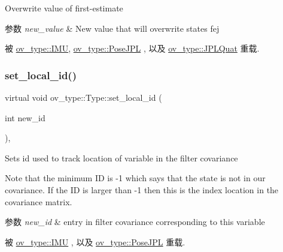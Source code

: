 Overwrite value of first-\/estimate 


\begin{DoxyParams}{参数}
{\em new\+\_\+value} & New value that will overwrite state\textquotesingle{}s fej \\
\hline
\end{DoxyParams}


被 \hyperlink{classov__type_1_1IMU_aadf4a83a2371984898ca8c6a339617ce}{ov\+\_\+type\+::\+I\+MU}, \hyperlink{classov__type_1_1PoseJPL_aa20a30cf44fefdb749565c0e60fe027a}{ov\+\_\+type\+::\+Pose\+J\+PL} , 以及 \hyperlink{classov__type_1_1JPLQuat_ae631d6cf4ed4170234272be498fd22e3}{ov\+\_\+type\+::\+J\+P\+L\+Quat} 重载.

\mbox{\label{classov__type_1_1Type_a52cb2fe6e25dbe8875da3fd618cf0b61}} 
\subsubsection{\texorpdfstring{set\+\_\+local\+\_\+id()}{set\_local\_id()}}
{\footnotesize\ttfamily virtual void ov\+\_\+type\+::\+Type\+::set\+\_\+local\+\_\+id (\begin{DoxyParamCaption}\item[{int}]{new\+\_\+id }\end{DoxyParamCaption})\hspace{0.3cm}{\ttfamily [inline]}, {\ttfamily [virtual]}}



Sets id used to track location of variable in the filter covariance 

Note that the minimum ID is -\/1 which says that the state is not in our covariance. If the ID is larger than -\/1 then this is the index location in the covariance matrix.


\begin{DoxyParams}{参数}
{\em new\+\_\+id} & entry in filter covariance corresponding to this variable \\
\hline
\end{DoxyParams}


被 \hyperlink{classov__type_1_1IMU_a9d4e915d474e8e13591a11a54ac7c969}{ov\+\_\+type\+::\+I\+MU} , 以及 \hyperlink{classov__type_1_1PoseJPL_a2295d3fbdd9529c1464957961a886731}{ov\+\_\+type\+::\+Pose\+J\+PL} 重载.

